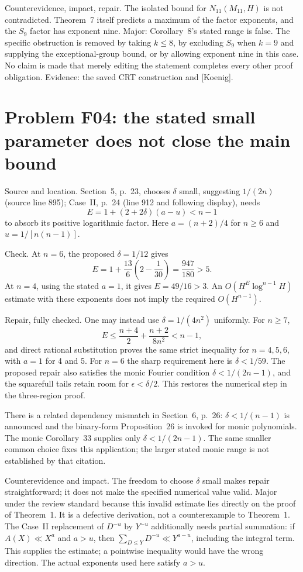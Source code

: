 \documentclass[10pt]{article}
\begin{document}
Counterevidence, impact, repair. The isolated bound for \(N_{11}(M_{11},H)\) is not contradicted. Theorem 7 itself predicts a maximum of the factor exponents, and the \(S_9\) factor has exponent nine. Major: Corollary 8’s stated range is false. The specific obstruction is removed by taking \(k\le8\), by excluding \(S_9\) when \(k=9\) and supplying the exceptional-group bound, or by allowing exponent nine in this case. No claim is made that merely editing the statement completes every other proof obligation. Evidence: the saved CRT construction and [Koenig].\par
\section*{Problem F04: the stated small parameter does not close the main bound}
Source and location. Section 5, p. 23, chooses \(\delta\) small, suggesting \(1/(2n)\) (source line 895); Case II, p. 24 (line 912 and following display), needs \[E=1+(2+2\delta)(a-u)<n-1\] to absorb its positive logarithmic factor. Here \(a=(n+2)/4\) for \(n\ge6\) and \(u=1/[n(n-1)]\).\par
Check. At \(n=6\), the proposed \(\delta=1/12\) gives \[E=1+\frac{13}{6}\left(2-\frac1{30}\right)
   =\frac{947}{180}>5.\] At \(n=4\), using the stated \(a=1\), it gives \(E=49/16>3\). An \(O(H^E\log^{n-1}H)\) estimate with these exponents does not imply the required \(O(H^{n-1})\).\par
Repair, fully checked. One may instead use \(\delta=1/(4n^2)\) uniformly. For \(n\ge7\), \[E\le\frac{n+4}{2}+\frac{n+2}{8n^2}<n-1,\] and direct rational substitution proves the same strict inequality for \(n=4,5,6\), with \(a=1\) for 4 and 5. For \(n=6\) the sharp requirement here is \(\delta<1/59\). The proposed repair also satisfies the monic Fourier condition \(\delta<1/(2n-1)\), and the squarefull tails retain room for \(\epsilon<\delta/2\). This restores the numerical step in the three-region proof.\par
There is a related dependency mismatch in Section 6, p. 26: \(\delta<1/(n-1)\) is announced and the binary-form Proposition 26 is invoked for monic polynomials. The monic Corollary 33 supplies only \(\delta<1/(2n-1)\). The same smaller common choice fixes this application; the larger stated monic range is not established by that citation.\par
Counterevidence and impact. The freedom to choose \(\delta\) small makes repair straightforward; it does not make the specified numerical value valid. Major under the review standard because this invalid estimate lies directly on the proof of Theorem 1. It is a defective derivation, not a counterexample to Theorem 1. The Case II replacement of \(D^{-u}\) by \(Y^{-u}\) additionally needs partial summation: if \(A(X)\ll X^a\) and \(a>u\), then \(\sum_{D\le Y}D^{-u}\ll Y^{a-u}\), including the integral term. This supplies the estimate; a pointwise inequality would have the wrong direction. The actual exponents used here satisfy \(a>u\).\par
\end{document}
